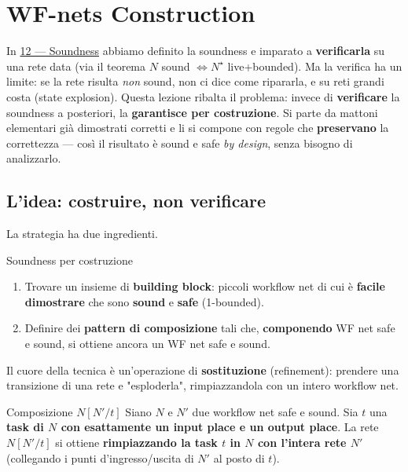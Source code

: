 \chapter{\texorpdfstring{WF-nets Construction}{WF-nets Construction}}
\label{ch:13}

In \hyperref[ch:12]{12 — Soundness} abbiamo definito la soundness e imparato a \textbf{verificarla} su una rete data (via il teorema $N$ sound $\iff N^\star$ live+bounded). Ma la verifica ha un limite: se la rete risulta \emph{non} sound, non ci dice come ripararla, e su reti grandi costa (state explosion). Questa lezione ribalta il problema: invece di \textbf{verificare} la soundness a posteriori, la \textbf{garantisce per costruzione}. Si parte da mattoni elementari già dimostrati corretti e li si compone con regole che \textbf{preservano} la correttezza — così il risultato è sound e safe \emph{by design}, senza bisogno di analizzarlo.

\section{\texorpdfstring{L'idea: costruire, non verificare}{L'idea: costruire, non verificare}}

La strategia ha due ingredienti.

\begin{boxtip}{Soundness per costruzione}
\begin{enumerate}
\item Trovare un insieme di \textbf{building block}: piccoli workflow net di cui è \textbf{facile dimostrare} che sono \textbf{sound} e \textbf{safe} (1-bounded).
\item Definire dei \textbf{pattern di composizione} tali che, \textbf{componendo} WF net safe e sound, si ottiene ancora un WF net safe e sound.
\end{enumerate}
\end{boxtip}

Il cuore della tecnica è un'operazione di \textbf{sostituzione} (refinement): prendere una transizione di una rete e "esploderla", rimpiazzandola con un intero workflow net.

\begin{boxdefinition}{Composizione $N[N'/t]$}
Siano $N$ e $N'$ due workflow net safe e sound. Sia $t$ una \textbf{task di $N$ con esattamente un input place e un output place}. La rete $N[N'/t]$ si ottiene \textbf{rimpiazzando la task $t$ in $N$ con l'intera rete $N'$} (collegando i punti d'ingresso/uscita di $N'$ al posto di $t$).
\end{boxdefinition}

